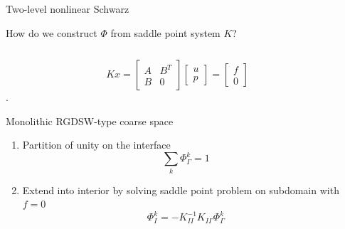 \begin{frame}{Two-level nonlinear Schwarz}
	\hspace*{-7mm}
	
\end{frame}

\begin{frame}{How do we construct $\varPhi$ from saddle point system $K$?}
	\begin{columns}
		\begin{column}{0.52\textwidth}
			\vspace{-3mm}
			\begin{equation*}
				Kx = \begin{bmatrix} A & B^T \\ B & 0 \end{bmatrix}\begin{bmatrix}u\\p\end{bmatrix} = \begin{bmatrix}f\\0\end{bmatrix}
			\end{equation*}.
			\begin{block}{\normalsize Monolithic RGDSW-type coarse space}
				\begin{enumerate}
					\item Partition of unity on the interface \begin{equation*}\sum_k \varPhi_\Gamma^k = 1\end{equation*}
					\item<3-> Extend into interior by solving saddle point problem on subdomain with $f = 0$
					      \begin{equation*}
						      \varPhi_I^k = -K_{II}^{-1}K_{I\Gamma}\varPhi_\Gamma^k
					      \end{equation*}
				\end{enumerate}
			\end{block}
		\end{column}
		\begin{column}{0.52\textwidth}
			\vspace{-8mm}
\end{column}
\end{columns}
\end{frame}
